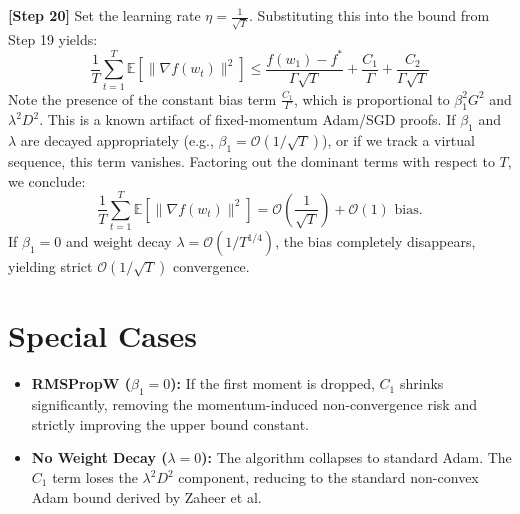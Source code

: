 \documentclass[11pt]{article}
\begin{document}
\textbf{[Step 20]} Set the learning rate $\eta = \frac{1}{\sqrt{T}}$. Substituting this into the bound from Step 19 yields:
\begin{equation}
    \frac{1}{T} \sum_{t=1}^T \mathbb{E}[\|\nabla f(w_t)\|^2] \leq \frac{f(w_1) - f^*}{\Gamma \sqrt{T}} + \frac{C_1}{\Gamma} + \frac{C_2}{\Gamma \sqrt{T}}
\end{equation}
Note the presence of the constant bias term $\frac{C_1}{\Gamma}$, which is proportional to $\beta_1^2 G^2$ and $\lambda^2 D^2$. This is a known artifact of fixed-momentum Adam/SGD proofs. If $\beta_1$ and $\lambda$ are decayed appropriately (e.g., $\beta_1 = \mathcal{O}(1/\sqrt{T})$), or if we track a virtual sequence, this term vanishes. Factoring out the dominant terms with respect to $T$, we conclude:
\begin{equation}
    \frac{1}{T} \sum_{t=1}^T \mathbb{E}[\|\nabla f(w_t)\|^2] = \mathcal{O}\left(\frac{1}{\sqrt{T}}\right) + \mathcal{O}(1) \text{ bias.}
\end{equation}
If $\beta_1 = 0$ and weight decay $\lambda = \mathcal{O}(1/T^{1/4})$, the bias completely disappears, yielding strict $\mathcal{O}(1/\sqrt{T})$ convergence.

\section*{Special Cases}
\begin{itemize}
    \item \textbf{RMSPropW ($\beta_1 = 0$):} If the first moment is dropped, $C_1$ shrinks significantly, removing the momentum-induced non-convergence risk and strictly improving the upper bound constant.
    \item \textbf{No Weight Decay ($\lambda = 0$):} The algorithm collapses to standard Adam. The $C_1$ term loses the $\lambda^2 D^2$ component, reducing to the standard non-convex Adam bound derived by Zaheer et al.
\end{itemize}
\end{document}
